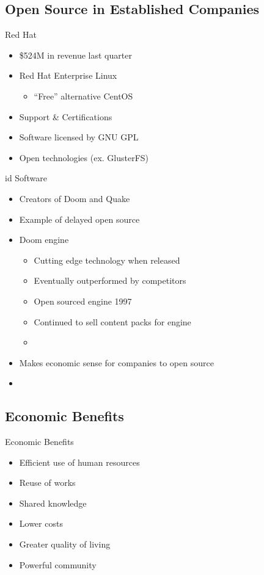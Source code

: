 \subsection{Open Source in Established Companies}
\begin{frame}{Red Hat}
  \begin{itemize}
    \item \$524M in revenue last quarter~\cite[p.~24]{redhat}
    \item Red Hat Enterprise Linux
      \begin{itemize}
        \item ``Free'' alternative CentOS
      \end{itemize}
    \item Support \& Certifications
    \item Software licensed by GNU GPL
    \item Open technologies (ex. GlusterFS)
  \end{itemize}
\end{frame}

\begin{frame}{id Software}
  \begin{itemize}
    \item Creators of Doom and Quake
    \item Example of delayed open source
    \item Doom engine
      \begin{itemize}
        \item Cutting edge technology when released
        \item Eventually outperformed by competitors
        \item Open sourced engine 1997
        \item Continued to sell content packs for engine
        \item\cite[p.~1188]{caulkins}
      \end{itemize}
    \item Makes economic sense for companies to open source
    \item\cite{caulkins}
  \end{itemize}
\end{frame}

\subsection{Economic Benefits}
\begin{frame}{Economic Benefits}
  \begin{itemize}
    \item Efficient use of human resources
    \item Reuse of works
    \item Shared knowledge
    \item Lower costs
    \item Greater quality of living
    \item Powerful community
  \end{itemize}
\end{frame}
